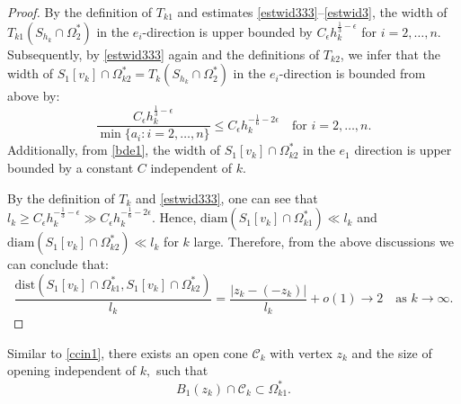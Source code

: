 \documentclass[11pt]{amsart}
\theoremstyle{plain}
\newcommand{\0}{\textbf{0}}
\numberwithin{equation}{section}
\numberwithin{equation}{section}
\numberwithin{figure}{section}
\begin{document}
\begin{proof}
  By the definition of \(T_{k1}\) and estimates \eqref{estwid333}--\eqref{estwid3}, the width of \(T_{k1}(S_{h_k} \cap \Omega_2^*)\) in the \(e_i\)-direction is upper bounded by \(C_\epsilon h_k^{\frac{1}{3}-\epsilon}\) for \(i = 2, \dots, n\). 
  Subsequently, by \eqref{estwid333} again and the definitions of \(T_{k2}\), we infer that the width of \(S_1[v_k] \cap \Omega^*_{k2} = T_k(S_{h_k} \cap \Omega_2^*)\) in the \(e_i\)-direction is bounded from above by:
  \begin{equation}\label{estwid5}
    \frac{C_\epsilon h_k^{\frac{1}{3}-\epsilon}}{\min\{a_i : i=2, \dots, n\}} \leq C_\epsilon h_k^{-\frac{1}{6}-2\epsilon} \quad \text{for } i = 2, \dots, n.
  \end{equation}
  Additionally, from \eqref{bde1}, the width of \(S_1[v_k] \cap \Omega^*_{k2}\) in the \(e_1\) direction is upper bounded by a constant \(C\) independent of \(k\). 
  
By the definition of \(T_{k}\) and \eqref{estwid333}, one can see that \(l_k \geq C_\epsilon h_k^{-\frac{1}{3}-\epsilon} \gg C_\epsilon h_k^{-\frac{1}{6}-2\epsilon}\).
 Hence, \(\text{diam}\left(S_1[v_k] \cap \Omega^*_{k1}\right) \ll l_k\) and \(\text{diam}\left(S_1[v_k] \cap \Omega^*_{k2}\right) \ll l_k\) for \(k\) large.
Therefore, from the above discussions we can conclude that:
  \[
  \frac{\mathrm{dist}(S_1[v_k] \cap \Omega^*_{k1}, S_1[v_k] \cap \Omega^*_{k2})}{l_k} = \frac{|z_k-(-z_k)|}{l_k} +o(1) \rightarrow 2 \quad \text{as } k \rightarrow \infty.
  \]
\end{proof}


Similar to \eqref{ccin1}, there exists an open cone $\mathcal{C}_k$ with vertex $z_k$ and the size of opening independent of $k,$ such that 
\begin{equation}\label{conek}
B_1(z_k)\cap \mathcal{C}_k\subset \Omega_{k1}^*.
\end{equation}
\end{document}
